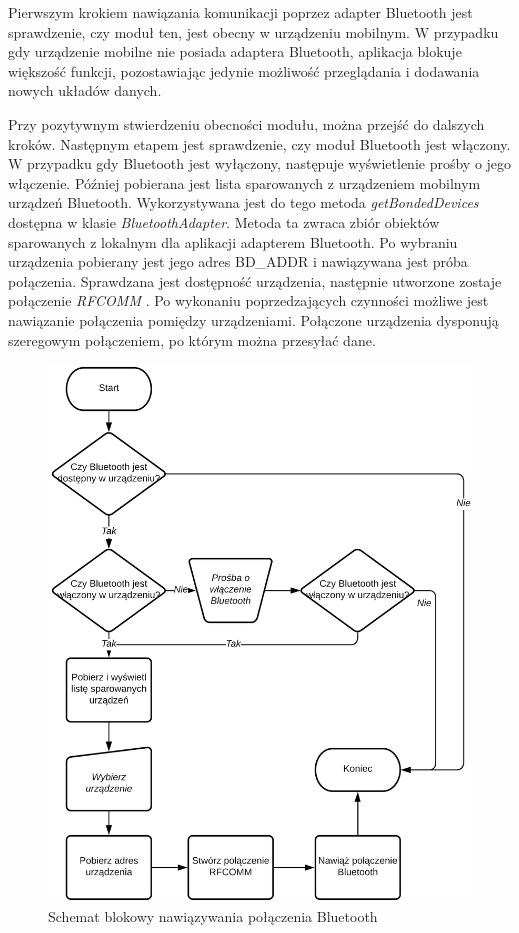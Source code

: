 \documentclass[a4paper,12pt, twoside]{article}
\begin{document}
    	Pierwszym krokiem nawiązania komunikacji poprzez adapter Bluetooth jest sprawdzenie, czy moduł ten, jest obecny w urządzeniu mobilnym. W przypadku gdy urządzenie mobilne nie posiada adaptera Bluetooth, aplikacja blokuje większość funkcji, pozostawiając jedynie możliwość przeglądania i dodawania nowych układów danych. 
    	
    	Przy pozytywnym stwierdzeniu obecności modułu, można przejść do dalszych kroków. Następnym etapem jest sprawdzenie, czy moduł Bluetooth jest włączony. W przypadku gdy Bluetooth jest wyłączony, następuje wyświetlenie prośby o jego włączenie. Później pobierana jest lista sparowanych z urządzeniem mobilnym urządzeń Bluetooth. Wykorzystywana jest do tego metoda \textit{getBondedDevices}\cite{bonded} dostępna w klasie \textit{BluetoothAdapter}. Metoda ta zwraca zbiór obiektów sparowanych z lokalnym dla aplikacji adapterem Bluetooth. Po wybraniu urządzenia pobierany jest jego adres BD\_ADDR i nawiązywana jest próba połączenia. Sprawdzana jest dostępność urządzenia, następnie utworzone zostaje połączenie \textit{RFCOMM} \cite{rfcomm}. Po wykonaniu poprzedzających czynności możliwe jest nawiązanie połączenia pomiędzy urządzeniami. Połączone urządzenia dysponują szeregowym połączeniem, po którym można przesyłać dane.
    	
    	\begin{figure}[H]
    	        \centering
    			\includegraphics[width=12cm]{images/rys_12bluetoothconnection.png}
    			\caption{Schemat blokowy nawiązywania połączenia Bluetooth}
                \label{fig:btconnect}
    	\end{figure}
    	
\end{document}
